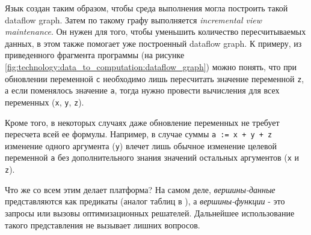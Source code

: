 Язык создан таким образом, чтобы среда выполнения могла построить такой dataflow graph. Затем по такому графу выполняется \emph{incremental view maintenance}. Он нужен для того, чтобы уменьшить количество пересчитываемых данных, в этом также помогает уже построенный dataflow graph. К примеру, из приведенного фрагмента программы (на рисунке \ref{fig:technology:data_to_computation:dataflow_graph}) можно понять, что при обновлении переменной \lstinline{c} необходимо лишь пересчитать значение переменной \lstinline{z}, а если поменялось значение \lstinline{a}, тогда нужно провести вычисления для всех переменных (\lstinline{x}, \lstinline{y}, \lstinline{z}).

Кроме того, в некоторых случаях даже обновление переменных не требует пересчета всей ее формулы. Например, в случае суммы \lstinline{a := x + y + z} изменение одного аргумента (\lstinline{y}) влечет лишь обычное изменение целевой переменной \lstinline{a} без дополнительного знания значений остальных аргументов (\lstinline{x} и \lstinline{z}).

Что же со всем этим делает платформа? На самом деле, \emph{вершины-данные} представляются как предикаты (аналог таблиц в \sql), а \emph{вершины-функции} - это запросы или вызовы оптимизационных решателей. Дальнейшее использование такого представления не вызывает лишних вопросов.
